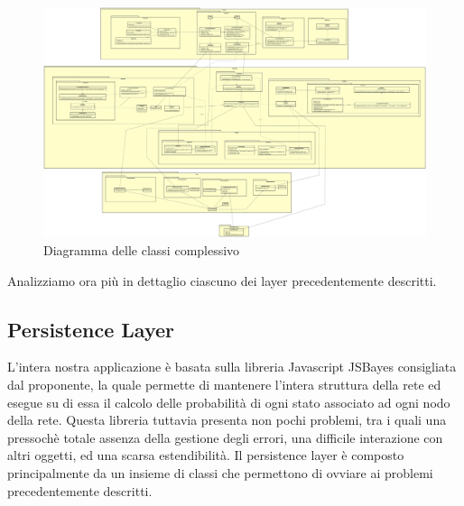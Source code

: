\begin{figure} [H]
	\centering
	\includegraphics[scale=0.07]{Img/Diagramma_Classi}
	\caption{Diagramma delle classi complessivo}\label{}
\end{figure}
Analizziamo ora più in dettaglio ciascuno dei layer precedentemente descritti.
\subsection{Persistence Layer}
L'intera nostra applicazione è basata sulla libreria Javascript JSBayes consigliata dal proponente, la quale permette di mantenere l'intera struttura della rete ed esegue su di essa il calcolo delle probabilità di ogni stato associato ad ogni nodo della rete.
Questa libreria tuttavia presenta non pochi problemi, tra i quali una pressochè totale assenza della gestione degli errori, una difficile interazione con altri oggetti, ed una scarsa estendibilità.
Il persistence layer è composto principalmente da un insieme di classi che permettono di ovviare ai problemi precedentemente descritti.
